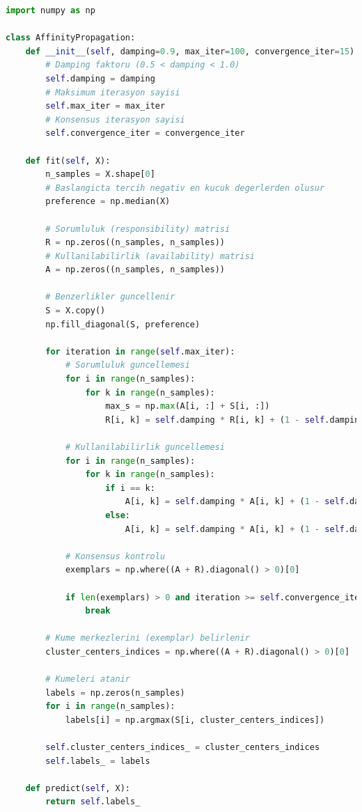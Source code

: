 \begin{lstlisting}[language=Python, caption=Scikit-learn'de AffinityPropagation örneği.]
import numpy as np

class AffinityPropagation:
    def __init__(self, damping=0.9, max_iter=100, convergence_iter=15):
        # Damping faktoru (0.5 < damping < 1.0)
        self.damping = damping
        # Maksimum iterasyon sayisi
        self.max_iter = max_iter
        # Konsensus iterasyon sayisi
        self.convergence_iter = convergence_iter

    def fit(self, X):
        n_samples = X.shape[0]
        # Baslangicta tercih negativ en kucuk degerlerden olusur
        preference = np.median(X)

        # Sorumluluk (responsibility) matrisi
        R = np.zeros((n_samples, n_samples))
        # Kullanilabilirlik (availability) matrisi
        A = np.zeros((n_samples, n_samples))

        # Benzerlikler guncellenir
        S = X.copy()
        np.fill_diagonal(S, preference)

        for iteration in range(self.max_iter):
            # Sorumluluk guncellemesi
            for i in range(n_samples):
                for k in range(n_samples):
                    max_s = np.max(A[i, :] + S[i, :])
                    R[i, k] = self.damping * R[i, k] + (1 - self.damping) * (S[i, k] - max_s)

            # Kullanilabilirlik guncellemesi
            for i in range(n_samples):
                for k in range(n_samples):
                    if i == k:
                        A[i, k] = self.damping * A[i, k] + (1 - self.damping) * np.sum(np.maximum(R[:, k], 0))
                    else:
                        A[i, k] = self.damping * A[i, k] + (1 - self.damping) * np.minimum(0, R[k, k] + np.sum(np.maximum(R[:, k], 0) - R[i, k]))

            # Konsensus kontrolu
            exemplars = np.where((A + R).diagonal() > 0)[0]

            if len(exemplars) > 0 and iteration >= self.convergence_iter:
                break

        # Kume merkezlerini (exemplar) belirlenir
        cluster_centers_indices = np.where((A + R).diagonal() > 0)[0]

        # Kumeleri atanir
        labels = np.zeros(n_samples)
        for i in range(n_samples):
            labels[i] = np.argmax(S[i, cluster_centers_indices])

        self.cluster_centers_indices_ = cluster_centers_indices
        self.labels_ = labels

    def predict(self, X):
        return self.labels_
\end{lstlisting}

